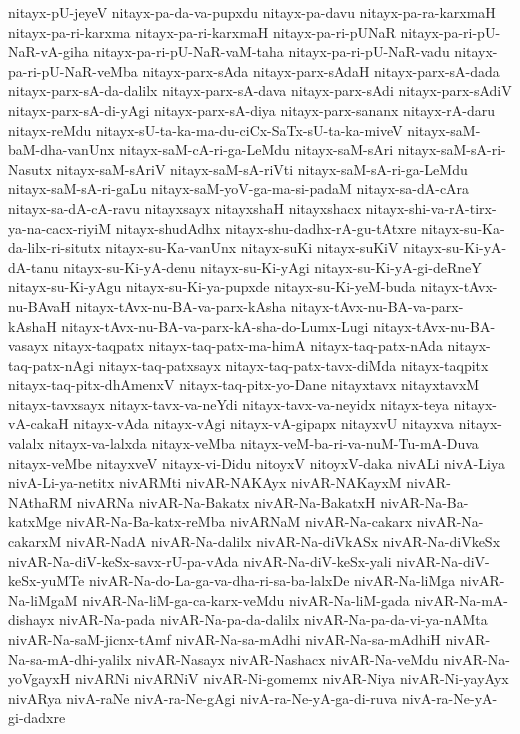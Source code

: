 {nitayx-pU-jeyeV
nitayx-pa-da-va-pupxdu
nitayx-pa-davu
nitayx-pa-ra-karxmaH
nitayx-pa-ri-karxma
nitayx-pa-ri-karxmaH
nitayx-pa-ri-pUNaR
nitayx-pa-ri-pU-NaR-vA-giha
nitayx-pa-ri-pU-NaR-vaM-taha
nitayx-pa-ri-pU-NaR-vadu
nitayx-pa-ri-pU-NaR-veMba
nitayx-parx-sAda
nitayx-parx-sAdaH
nitayx-parx-sA-dada
nitayx-parx-sA-da-dalilx
nitayx-parx-sA-dava
nitayx-parx-sAdi
nitayx-parx-sAdiV
nitayx-parx-sA-di-yAgi
nitayx-parx-sA-diya
nitayx-parx-sananx
nitayx-rA-daru
nitayx-reMdu
nitayx-sU-ta-ka-ma-du-ciCx-SaTx-sU-ta-ka-miveV
nitayx-saM-baM-dha-vanUnx
nitayx-saM-cA-ri-ga-LeMdu
nitayx-saM-sAri
nitayx-saM-sA-ri-Nasutx
nitayx-saM-sAriV
nitayx-saM-sA-riVti
nitayx-saM-sA-ri-ga-LeMdu
nitayx-saM-sA-ri-gaLu
nitayx-saM-yoV-ga-ma-si-padaM
nitayx-sa-dA-cAra
nitayx-sa-dA-cA-ravu
nitayxsayx
nitayxshaH
nitayxshacx
nitayx-shi-va-rA-tirx-ya-na-cacx-riyiM
nitayx-shudAdhx
nitayx-shu-dadhx-rA-gu-tAtxre
nitayx-su-Ka-da-lilx-ri-situtx
nitayx-su-Ka-vanUnx
nitayx-suKi
nitayx-suKiV
nitayx-su-Ki-yA-dA-tanu
nitayx-su-Ki-yA-denu
nitayx-su-Ki-yAgi
nitayx-su-Ki-yA-gi-deRneY
nitayx-su-Ki-yAgu
nitayx-su-Ki-ya-pupxde
nitayx-su-Ki-yeM-buda
nitayx-tAvx-nu-BAvaH
nitayx-tAvx-nu-BA-va-parx-kAsha
nitayx-tAvx-nu-BA-va-parx-kAshaH
nitayx-tAvx-nu-BA-va-parx-kA-sha-do-Lumx-Lugi
nitayx-tAvx-nu-BA-vasayx
nitayx-taqpatx
nitayx-taq-patx-ma-himA
nitayx-taq-patx-nAda
nitayx-taq-patx-nAgi
nitayx-taq-patxsayx
nitayx-taq-patx-tavx-diMda
nitayx-taqpitx
nitayx-taq-pitx-dhAmenxV
nitayx-taq-pitx-yo-Dane
nitayxtavx
nitayxtavxM
nitayx-tavxsayx
nitayx-tavx-va-neYdi
nitayx-tavx-va-neyidx
nitayx-teya
nitayx-vA-cakaH
nitayx-vAda
nitayx-vAgi
nitayx-vA-gipapx
nitayxvU
nitayxva
nitayx-valalx
nitayx-va-lalxda
nitayx-veMba
nitayx-veM-ba-ri-va-nuM-Tu-mA-Duva
nitayx-veMbe
nitayxveV
nitayx-vi-Didu
nitoyxV
nitoyxV-daka
nivALi
nivA-Liya
nivA-Li-ya-netitx
nivARMti
nivAR-NAKAyx
nivAR-NAKayxM
nivAR-NAthaRM
nivARNa
nivAR-Na-Bakatx
nivAR-Na-BakatxH
nivAR-Na-Ba-katxMge
nivAR-Na-Ba-katx-reMba
nivARNaM
nivAR-Na-cakarx
nivAR-Na-cakarxM
nivAR-NadA
nivAR-Na-dalilx
nivAR-Na-diVkASx
nivAR-Na-diVkeSx
nivAR-Na-diV-keSx-savx-rU-pa-vAda
nivAR-Na-diV-keSx-yali
nivAR-Na-diV-keSx-yuMTe
nivAR-Na-do-La-ga-va-dha-ri-sa-ba-lalxDe
nivAR-Na-liMga
nivAR-Na-liMgaM
nivAR-Na-liM-ga-ca-karx-veMdu
nivAR-Na-liM-gada
nivAR-Na-mA-dishayx
nivAR-Na-pada
nivAR-Na-pa-da-dalilx
nivAR-Na-pa-da-vi-ya-nAMta
nivAR-Na-saM-jicnx-tAmf
nivAR-Na-sa-mAdhi
nivAR-Na-sa-mAdhiH
nivAR-Na-sa-mA-dhi-yalilx
nivAR-Nasayx
nivAR-Nashacx
nivAR-Na-veMdu
nivAR-Na-yoVgayxH
nivARNi
nivARNiV
nivAR-Ni-gomemx
nivAR-Niya
nivAR-Ni-yayAyx
nivARya
nivA-raNe
nivA-ra-Ne-gAgi
nivA-ra-Ne-yA-ga-di-ruva
nivA-ra-Ne-yA-gi-dadxre
}
